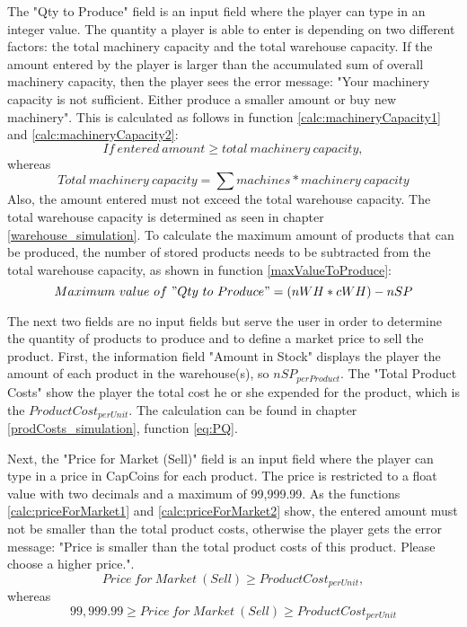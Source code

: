 The "Qty to Produce" field is an input field where the player can type in an integer value. The quantity a player is able to enter is depending on two different factors: the total machinery capacity and the total warehouse capacity. If the amount entered by the player is larger than the accumulated sum of overall machinery capacity, then the player sees the error message: "Your machinery capacity is not sufficient. Either produce a smaller amount or buy new machinery". This is calculated as follows in function \ref{calc:machineryCapacity1} and \ref{calc:machineryCapacity2}:
\begin{equation}
\label{calc:machineryCapacity1}
   If~entered~amount \geqslant total~machinery~capacity, 
\end{equation}
whereas 
\begin{equation}
\label{calc:machineryCapacity2}
    Total~machinery~capacity = \sum  machines * machinery~capacity
\end{equation}
Also, the amount entered must not exceed the total warehouse capacity. The total warehouse capacity is determined as seen in chapter \ref{warehouse_simulation}. To calculate the maximum amount of products that can be produced, the number of stored products needs to be subtracted from the total warehouse capacity, as shown in function \ref{maxValueToProduce}:
\begin{equation}
\label{maxValueToProduce}
    Maximum~value~of~"Qty~to~Produce" = (nWH * cWH) - nSP
\end{equation}

The next two fields are no input fields but serve the user in order to determine the quantity of products to produce and to define a market price to sell the product. First, the information field "Amount in Stock" displays the player the amount of each product in the warehouse(s), so $nSP_{per Product}$. The "Total Product Costs" show the player the total cost he or she expended for the product, which is the $ProductCost_{perUnit}$. The calculation can be found in chapter \ref{prodCosts_simulation}, function \ref{eq:PQ}.

Next, the "Price for Market (Sell)" field is an input field where the player can type in a price in CapCoins for each product. The price is restricted to a float value with two decimals and a maximum of 99,999.99. As the functions \ref{calc:priceForMarket1} and \ref{calc:priceForMarket2} show, the entered amount must not be smaller than the total product costs, otherwise the player gets the error message: "Price is smaller than the total product costs of this product. Please choose a higher price.".
\begin{equation}
\label{calc:priceForMarket1}
    Price~for~Market~(Sell) \geqslant ProductCost_{perUnit},
\end{equation}
whereas
\begin{equation}
\label{calc:priceForMarket2}
    99,999.99 \geqslant Price~for~Market~(Sell) \geqslant ProductCost_{perUnit}
\end{equation}

